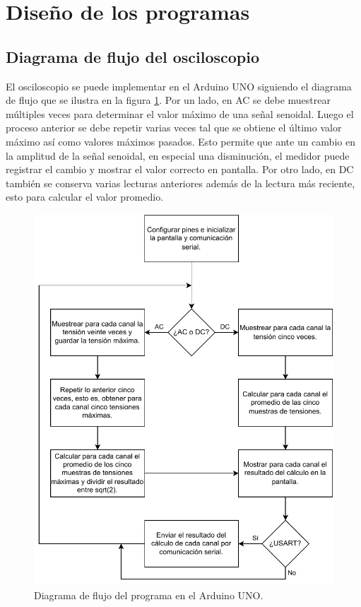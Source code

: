 \section{Diseño de los programas}
\subsection{Diagrama de flujo del osciloscopio}
El osciloscopio se puede implementar en el Arduino UNO siguiendo el diagrama de flujo que se ilustra en la figura \ref{fsm}. Por un lado, en AC se debe muestrear múltiples veces para determinar el valor máximo de una señal senoidal. Luego el proceso anterior se debe repetir varias veces tal que se obtiene el último valor máximo así como valores máximos pasados. Esto permite que ante un cambio en la amplitud de la señal senoidal, en especial una disminución, el medidor puede registrar el cambio y mostrar el valor correcto en pantalla.
Por otro lado, en DC también se conserva varias lecturas anteriores además de la lectura más reciente, esto para calcular el valor promedio.
\begin{figure}[H]
    \centering
    \includegraphics[width=14cm]{Imagenes/fsm.pdf}
    \caption{Diagrama de flujo del programa en el Arduino UNO.}
    \label{fsm}
\end{figure}


